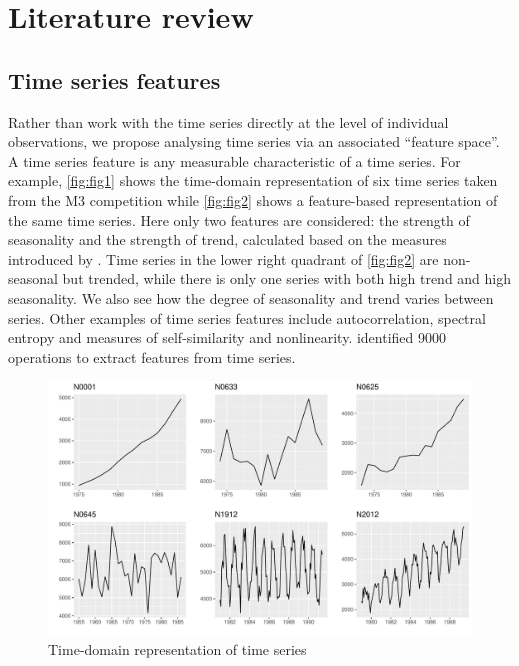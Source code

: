 \documentclass[11pt,a4paper,]{article}
\begin{document}
\hypertarget{litreview}{%
\section{Literature review}\label{litreview}}

\hypertarget{time-series-features}{%
\subsection{Time series features}\label{time-series-features}}

Rather than work with the time series directly at the level of individual observations, we propose analysing time series via an associated ``feature space''. A time series feature is any measurable characteristic of a time series. For example, \autoref{fig:fig1} shows the time-domain representation of six time series taken from the M3 competition \autocite{makridakis2000m3} while \autoref{fig:fig2} shows a feature-based representation of the same time series. Here only two features are considered: the strength of seasonality and the strength of trend, calculated based on the measures introduced by \textcite{wang2009rule}. Time series in the lower right quadrant of \autoref{fig:fig2} are non-seasonal but trended, while there is only one series with both high trend and high seasonality. We also see how the degree of seasonality and trend varies between series. Other examples of time series features include autocorrelation, spectral entropy and measures of self-similarity and nonlinearity. \textcite{fulcher2014highly} identified 9000 operations to extract features from time series.

\begin{figure}

{\centering \includegraphics[width=\textwidth]{figure/fig1-1} 

}

\caption{Time-domain representation of time series}\label{fig:fig1}
\end{figure}
\end{document}
